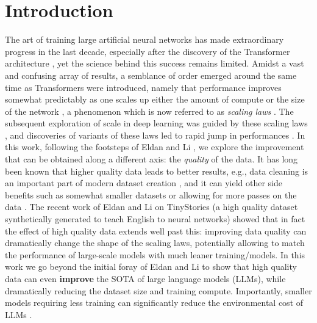 \section{Introduction}
The art of training large artificial neural networks has made extraordinary progress in the last decade, especially after the discovery of the Transformer architecture \cite{Vas17}, yet the science behind this success remains limited. Amidst a vast and confusing array of results, a semblance of order emerged around the same time as Transformers were introduced, namely that performance improves somewhat predictably as one scales up either the amount of compute or the size of the network \cite{hestness2017deep}, a phenomenon which is now referred to as {\em scaling laws} \cite{kaplan2020scaling}. The subsequent exploration of scale in deep learning was guided by these scaling laws \cite{gpt3}, and discoveries of variants of these laws led to rapid jump in performances \cite{hoffmann2022an}. In this work, following the footsteps of Eldan and Li \cite{eldan2023tinystories}, we explore the improvement that can be obtained along a different axis: the {\em quality} of the data. It has long been known that higher quality data leads to better results, e.g., data cleaning is an important part of modern dataset creation \cite{raffel2020exploring}, and it can yield other side benefits such as somewhat smaller datasets \cite{longpre2023pretrainer, yu2023selective} or allowing for more passes on the data \cite{muennighoff2023scaling}. The recent work of Eldan and Li on TinyStories (a high quality dataset synthetically generated to teach English to neural networks) showed that in fact the effect of high quality data extends well past this: improving data quality can dramatically change the shape of the scaling laws, potentially allowing to match the performance of large-scale models with much leaner training/models. In this work we go beyond the initial foray of Eldan and Li to show that high quality data can even \textbf{improve} the SOTA of large language models (LLMs), while dramatically reducing the dataset size and training compute. Importantly, smaller models requiring less training can significantly reduce the environmental cost of LLMs \cite{bender2021dangers}.

